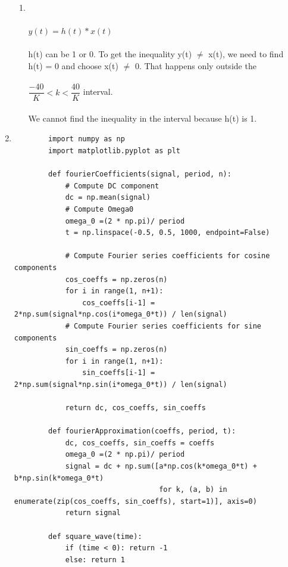 \documentclass[10pt,a4paper, margin=1in]{article}
\begin{document}
\begin{enumerate}
\begin{enumerate}
    \item %
    \\\\$y(t) = h(t) * x(t)$
    \\\\h(t) can be 1 or 0. To get the inequality y(t) $\neq$ x(t), we need to find h(t) = 0 and choose x(t) $\neq$ 0. That happens only outside the \\\\$\dfrac{-40}{K}<k<\dfrac{40}{K}$ interval.
    \\\\We cannot find the inequality in the interval because h(t) is 1. 
    \end{enumerate}    
    
\newpage
\item %
    \begin{enumerate}
         \begin{verbatim}
        import numpy as np
        import matplotlib.pyplot as plt
        
        def fourierCoefficients(signal, period, n):
            # Compute DC component
            dc = np.mean(signal)
            # Compute Omega0 
            omega_0 =(2 * np.pi)/ period
            t = np.linspace(-0.5, 0.5, 1000, endpoint=False)
        
            # Compute Fourier series coefficients for cosine components
            cos_coeffs = np.zeros(n)
            for i in range(1, n+1):
                cos_coeffs[i-1] = 2*np.sum(signal*np.cos(i*omega_0*t)) / len(signal)
            # Compute Fourier series coefficients for sine components
            sin_coeffs = np.zeros(n)
            for i in range(1, n+1):
                sin_coeffs[i-1] = 2*np.sum(signal*np.sin(i*omega_0*t)) / len(signal)
                
            return dc, cos_coeffs, sin_coeffs
        
        def fourierApproximation(coeffs, period, t):
            dc, cos_coeffs, sin_coeffs = coeffs
            omega_0 =(2 * np.pi)/ period
            signal = dc + np.sum([a*np.cos(k*omega_0*t) + b*np.sin(k*omega_0*t) 
                                  for k, (a, b) in enumerate(zip(cos_coeffs, sin_coeffs), start=1)], axis=0)
            return signal
        
        def square_wave(time):
            if (time < 0): return -1  
            else: return 1          
        

\end{verbatim}
\end{enumerate}
\end{enumerate}
\end{document}
